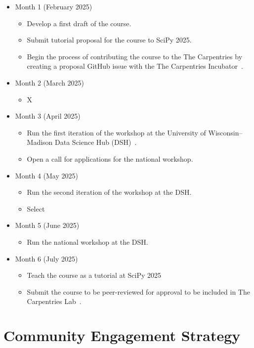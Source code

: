 \documentclass[letterpaper, 11pt]{article}
\newcommand{\fullinstitute}{University of Wisconsin--Madison}
\begin{document}
\begin{itemize}
  \item Month 1 (February 2025)
    \begin{itemize}
      \item Develop a first draft of the course.
      \item Submit tutorial proposal for the course to SciPy 2025.
      \item Begin the process of contributing the course to the The Carpentries by creating a proposal GitHub issue with the The Carpentries Incubator~\cite{carpentries_incubator_proposals}.
    \end{itemize}
  \item Month 2 (March 2025)
    \begin{itemize}
      \item X
    \end{itemize}
  \item Month 3 (April 2025)
    \begin{itemize}
      \item Run the first iteration of the workshop at the \fullinstitute{} Data Science Hub (DSH)~\cite{data_science_hub}.
      \item Open a call for applications for the national workshop.
    \end{itemize}
  \item Month 4 (May 2025)
    \begin{itemize}
      \item Run the second iteration of the workshop at the DSH.
      \item Select
    \end{itemize}
  \item Month 5 (June 2025)
    \begin{itemize}
      \item Run the national workshop at the DSH.
    \end{itemize}
  \item Month 6 (July 2025)
    \begin{itemize}
      \item Teach the course as a tutorial at SciPy 2025
      \item Submit the course to be peer-reviewed for approval to be included in The Carpentries Lab~\cite{carpentries_lab}.
    \end{itemize}
\end{itemize}

\section{Community Engagement Strategy}
\end{document}

